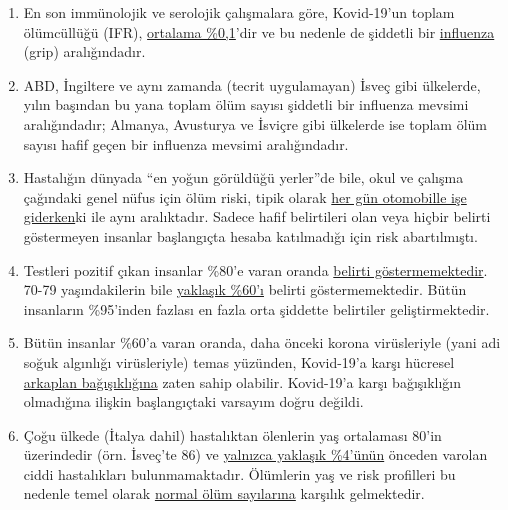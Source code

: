 \begin{enumerate}
\def\labelenumi{\arabic{enumi}.}
\tightlist
\item
  En son immünolojik ve serolojik çalışmalara göre, Kovid-19'un toplam
  ölümcüllüğü (IFR),
  \href{https://swprs.org/studies-on-covid-19-lethality/}{ortalama
  \%0,1}'dir ve bu nedenle de şiddetli bir
  \href{https://www.ebm-netzwerk.de/en/publications/covid-19}{influenza}
  (grip) aralığındadır.
\item
  ABD, İngiltere ve aynı zamanda (tecrit uygulamayan) İsveç gibi
  ülkelerde, yılın başından bu yana toplam ölüm sayısı şiddetli bir
  influenza mevsimi aralığındadır; Almanya, Avusturya ve İsviçre gibi
  ülkelerde ise toplam ölüm sayısı hafif geçen bir influenza mevsimi
  aralığındadır.
\item
  Hastalığın dünyada ``en yoğun görüldüğü yerler''de bile, okul ve
  çalışma çağındaki genel nüfus için ölüm riski, tipik olarak
  \href{https://www.medrxiv.org/content/10.1101/2020.04.05.20054361v1}{her
  gün otomobille işe giderken}ki ile aynı aralıktadır. Sadece hafif
  belirtileri olan veya hiçbir belirti göstermeyen insanlar başlangıçta
  hesaba katılmadığı için risk abartılmıştı.
\item
  Testleri pozitif çıkan insanlar \%80'e varan oranda
  \href{https://www.bmj.com/content/369/bmj.m1375}{belirti
  göstermemektedir}. 70-79 yaşındakilerin bile
  \href{https://www.niid.go.jp/niid/en/2019-ncov-e/9407-covid-dp-fe-01.html}{yaklaşık
  \%60'ı} belirti göstermemektedir. Bütün insanların \%95'inden fazlası
  en fazla orta şiddette belirtiler geliştirmektedir.
\item
  Bütün insanlar \%60'a varan oranda, daha önceki korona virüsleriyle
  (yani adi soğuk algınlığı virüsleriyle) temas yüzünden, Kovid-19'a
  karşı hücresel
  \href{https://www.cell.com/cell/fulltext/S0092-8674(20)30610-3}{arkaplan
  bağışıklığına} zaten sahip olabilir. Kovid-19'a karşı bağışıklığın
  olmadığına ilişkin başlangıçtaki varsayım doğru değildi.
\item
  Çoğu ülkede (İtalya dahil) hastalıktan ölenlerin yaş ortalaması 80'in
  üzerindedir (örn. İsveç'te 86) ve
  \href{https://www.bloomberg.com/news/articles/2020-05-26/italy-says-96-of-virus-fatalities-suffered-from-other-illnesses}{yalnızca
  yaklaşık \%4'ünün} önceden varolan ciddi hastalıkları bulunmamaktadır.
  Ölümlerin yaş ve risk profilleri bu nedenle temel olarak
  \href{https://www.vienna.at/analyse-zeigt-covid-19-opferkurve-entspricht-normaler-mortalitaet/6581246}{normal
  ölüm sayılarına} karşılık gelmektedir.

\end{enumerate}
